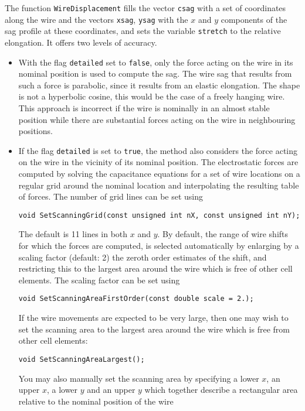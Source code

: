 The function \texttt{WireDisplacement} fills the vector 
\texttt{csag} with a set of coordinates along the wire and 
the vectors \texttt{xsag}, \texttt{ysag} with the $x$ and $y$ components 
of the sag profile at these coordinates, and sets the variable 
\texttt{stretch} to the relative elongation.  
It offers two levels of accuracy.
\begin{itemize}
\item
With the flag \texttt{detailed} set to \texttt{false}, only the force 
acting on the wire in its nominal position is used to compute the sag.
The wire sag that results from such a force is parabolic, since it 
results from an elastic elongation. The shape is not a hyperbolic cosine, 
this would be the case of a freely hanging wire.
This approach is incorrect if the wire is nominally in an almost stable 
position while there are substantial forces acting on the wire in 
neighbouring positions.
\item
If the flag \texttt{detailed} is set to \texttt{true}, the method also 
considers the force acting on the wire in the vicinity of its nominal 
position.
The electrostatic forces are computed by solving the capacitance equations for a set of wire locations on a regular grid around the nominal location 
and interpolating the resulting table of forces.
The number of grid lines can be set using
\begin{lstlisting}
void SetScanningGrid(const unsigned int nX, const unsigned int nY);
\end{lstlisting}
The default is 11 lines in both $x$ and $y$.
By default, the range of wire shifts for which the forces are computed, 
is selected automatically by enlarging by a scaling factor 
(default: 2) the zeroth order 
estimates of the shift, and restricting this to the largest area around 
the wire which is free of other cell elements. 
The scaling factor can be set using 
\begin{lstlisting}
void SetScanningAreaFirstOrder(const double scale = 2.);
\end{lstlisting}
If the wire movements are expected to be very large, then one may wish 
to set the scanning area to the largest area around the wire which is 
free from other cell elements:
\begin{lstlisting}
void SetScanningAreaLargest();
\end{lstlisting}
You may also manually set the scanning area by specifying a lower $x$, 
an upper $x$, a lower $y$  and an upper $y$ which together describe a 
rectangular area relative to the nominal position of the wire 

\end{itemize}
